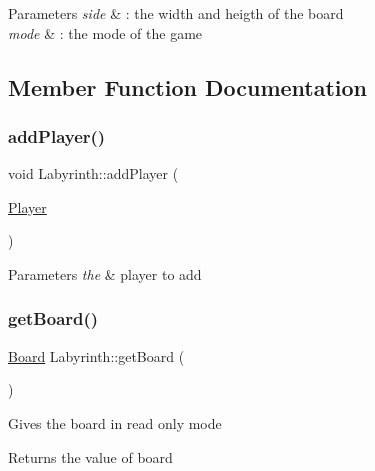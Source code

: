 \begin{DoxyParams}{Parameters}
{\em side} & \+: the width and heigth of the board \\
\hline
{\em mode} & \+: the mode of the game \\
\hline
\end{DoxyParams}


\subsection{Member Function Documentation}
\mbox{\label{classLabyrinth_ad1492b8efcf788402bdd161f6cfc03c6}} 
\subsubsection{\texorpdfstring{addPlayer()}{addPlayer()}}
{\footnotesize\ttfamily void Labyrinth\+::add\+Player (\begin{DoxyParamCaption}\item[{\mbox{\hyperlink{classPlayer}{Player}}}]{ }\end{DoxyParamCaption})}


\begin{DoxyParams}{Parameters}
{\em the} & player to add \\
\hline
\end{DoxyParams}
\mbox{\label{classLabyrinth_a8fcfe09eb620ff9b48f937ae6ff2c8aa}} 
\subsubsection{\texorpdfstring{getBoard()}{getBoard()}}
{\footnotesize\ttfamily \mbox{\hyperlink{classBoard}{Board}} Labyrinth\+::get\+Board (\begin{DoxyParamCaption}{ }\end{DoxyParamCaption})\hspace{0.3cm}{\ttfamily [inline]}}

Gives the board in read only mode

\begin{DoxyReturn}{Returns}
the value of board 
\end{DoxyReturn}
\mbox{\label{classLabyrinth_a69d0f4074fbaa91f8eb052b1b4ad8b97}} 
